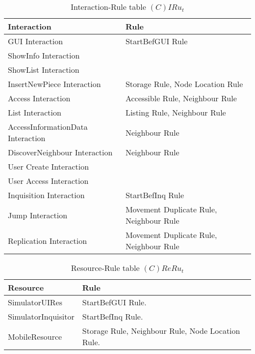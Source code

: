 \begin{table}[H]
	\centering
	\begin{tabular}{|p{4cm}|p{8cm}|}
			\hline
			\textbf{Interaction} & \textbf{Rule} \\
			\hline
			GUI Interaction & StartBefGUI Rule\\
			\hline
			ShowInfo Interaction & \\
			\hline
			ShowList Interaction & \\
			\hline
			InsertNewPiece Interaction & Storage Rule, Node Location Rule \\
			\hline
			Access Interaction & Accessible Rule, Neighbour Rule \\
			\hline
			List Interaction & Listing Rule, Neighbour Rule \\
			\hline
			AccessInformationData Interaction & Neighbour Rule\\
			\hline
			DiscoverNeighbour Interaction & Neighbour Rule\\
			\hline
			User Create Interaction & \\
			\hline
			User Access Interaction & \\
			\hline
			Inquisition Interaction & StartBefInq Rule \\
			\hline
			Jump Interaction & Movement Duplicate Rule, Neighbour Rule \\
			\hline
			Replication Interaction & Movement Duplicate Rule, Neighbour Rule \\
			\hline
		\end{tabular}
	\caption{Interaction-Rule table $(C)IRu_t$}
	\label{tab:cirut}
\end{table}

\begin{table}[H]
	\centering
	\begin{tabular}{|p{4cm}|p{8cm}|}
			\hline
			\textbf{Resource} & \textbf{Rule} \\
			\hline
			SimulatorUIRes & StartBefGUI Rule. \\
			\hline
			SimulatorInquisitor & StartBefInq Rule. \\
			\hline
			MobileResource & Storage Rule, Neighbour Rule, Node Location Rule. \\
			\hline
		\end{tabular}
	\caption{Resource-Rule table $(C)ReRu_t$}
	\label{tab:crerut}
\end{table}

